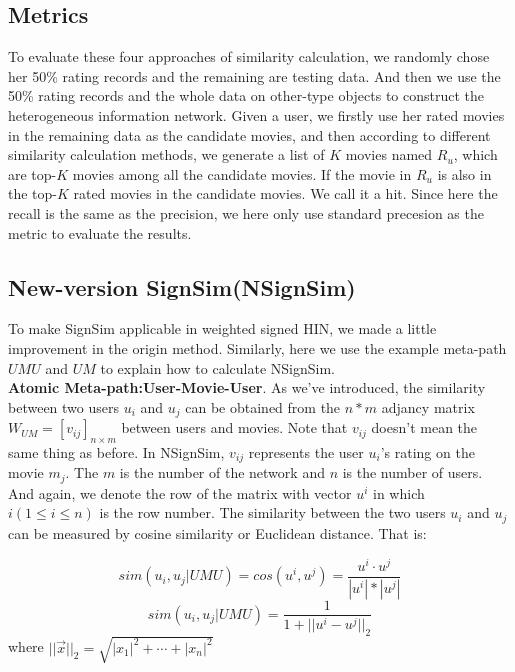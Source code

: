 \documentclass{acm_proc_article-csis8101}
\begin{document}
\subsection{Metrics}

To evaluate these four approaches of similarity calculation, we randomly chose her 50\% rating records and the remaining are testing data. And then we use the 50\% rating records and the whole data on other-type objects to construct the heterogeneous information network. Given a user, we firstly use her rated movies in the remaining data as the candidate movies, and then according to different similarity calculation methods, we generate a list of $K$ movies named $R_{u}$, which are top-$K$ movies among all the candidate movies. If the movie in $R_{u}$ is also in the top-$K$ rated movies in the candidate movies. We call it a hit. Since here the recall is the same as the precision, we here only use standard precesion as the metric to evaluate the results.

\subsection{New-version SignSim(NSignSim)}

To make SignSim applicable in weighted signed HIN, we made a little improvement in the origin method. Similarly, here we use the example meta-path $UMU$ and $UM$ to explain how to calculate NSignSim.\\

\textbf{Atomic Meta-path:User-Movie-User}. As we've introduced, the similarity between two users $u_{i}$ and $u_{j}$ can be obtained from the $n*m$ adjancy matrix $W_{UM} = [v_{ij}]_{n \times m}$ between users and movies. Note that $v_{ij}$ doesn't mean the same thing as before. In NSignSim, $v_{ij}$ represents the user $u_{i}$'s rating on the movie $m_{j}$. The $m$ is the number of the network and $n$ is the number of users. And again, we denote the row of the matrix with vector $u^{i}$  in which $i(1 \leq i \leq n)$ is the row number. The similarity between the two users $u_{i}$ and $u_{j}$ can be measured by cosine similarity or Euclidean distance. That is:

\begin{equation}
sim(u_{i},u_{j}|UMU)=cos(u^{i},u^{j})=\frac{u^{i} \cdot u^{j}}{|u^{i}|*|u^{j}|}
\end{equation}
\begin{equation}
sim(u_{i},u_{j}|UMU)=\frac{1}{1+||u^{i} - u^{j}||_{2}}
\end{equation}
where $||\overrightarrow{x}||_{2} = \sqrt{|x_{1}|^{2}+ \cdots + |x_{n}|^{2}}$
\end{document}

